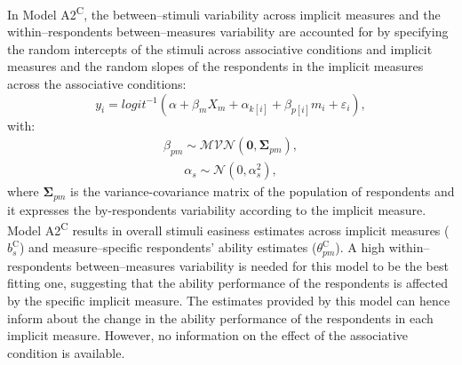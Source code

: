\documentclass[12pt]{book}
\begin{document}
In Model A2\textsuperscript{C}, the between--stimuli variability across implicit measures and the within--respondents between--measures variability are accounted for by specifying the random intercepts of the stimuli across associative conditions and implicit measures and the random slopes of the respondents in the implicit measures across the associative conditions: 
%
\begin{equation}\label{eq:type1}
	y_{i} = logit^{-1}(\alpha + \beta_mX_m + \alpha_{k[i]} +  \beta_{p[i]}m_{i} + \varepsilon_{i}),
\end{equation}
with:
\begin{align}
	\beta_{pm} \sim \mathcal{MVN}(\bm{0}, \bm{\Sigma}_{pm}),
\end{align}
\begin{align}
	\alpha_s \sim \mathcal{N} (0, \alpha_s^2),
\end{align}
where $\bm{\Sigma}_{pm}$ is the variance-covariance matrix of the population of respondents and it expresses the by-respondents variability according to the implicit measure. 
Model A2\textsuperscript{C} results in overall stimuli easiness estimates across implicit measures ($b_s^\text{C}$) and measure--specific respondents' ability estimates ($\theta_{pm}^\text{C}$). 
A high within--respondents between--measures variability is needed for this model to be the best fitting one, suggesting that the ability performance of the respondents is affected by the specific implicit measure. The estimates provided by this model can hence inform about the change in the ability performance of the respondents in each implicit measure. However, no information on the effect of the associative condition is available.
\end{document}
